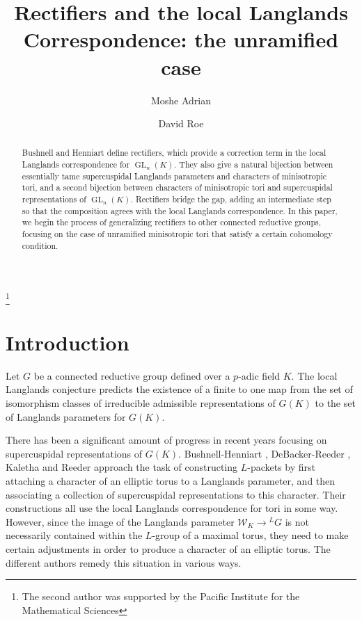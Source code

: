 \documentclass{amsart}
\theoremstyle{plain}
\theoremstyle{definition}
\numberwithin{equation}{section}
\DeclareMathOperator{\GL}{GL}
\newcommand{\Weil}{\mathcal{W}}
\begin{document}
\title[Rectifiers and the local Langlands Correspondence]{Rectifiers and the local Langlands Correspondence: the unramified case}
\author{Moshe Adrian}
\address{Department of Mathematics, University of Toronto, Toronto, ON M5S 2E4, Canada}
\author{David Roe}
\address{Department of Mathematics, University of British Columbia, Vancouver, BC V6K 1Z2, Canada}
\thanks{The second author was supported by the Pacific Institute for the Mathematical Sciences}


\begin{abstract}

Bushnell and Henniart define rectifiers, which provide a correction term
in the local Langlands correspondence for $\GL_n(K)$.  They also give a natural bijection
between essentially tame supercuspidal Langlands parameters
and characters of minisotropic tori, and a second bijection between characters
of minisotropic tori and supercuspidal representations of $\GL_n(K)$.  Rectifiers
bridge the gap, adding an intermediate step so that the composition agrees
with the local Langlands correspondence.
In this paper, we begin the process of generalizing rectifiers to other
connected reductive groups, focusing on the case of unramified minisotropic
tori that satisfy a certain cohomology condition.

\end{abstract}

\maketitle

\section{Introduction} \label{section:intro}

Let $G$ be a connected reductive group defined over a $p$-adic field $K$.
The local Langlands conjecture predicts the existence of a finite to one map
from the set of isomorphism classes of irreducible admissible representations
of $G(K)$ to the set of Langlands parameters for $G(K)$.

There has been a significant amount of progress in recent years
focusing on supercuspidal representations of $G(K)$.  Bushnell-Henniart \cite{bushnell-henniart:10a},
DeBacker-Reeder \cite{reeder-debacker:09a}, Kaletha \cite{kaletha:13a} and Reeder \cite{reeder:08a}
approach the task of constructing $L$-packets by first attaching
a character of an elliptic torus to a Langlands parameter, and
then associating a collection of supercuspidal representations to this character.
Their constructions all use the local Langlands correspondence for tori in some way.  However,
since the image of the Langlands parameter $\Weil_K \rightarrow {}^L G$ is not
necessarily contained within the $L$-group of a maximal torus, they need to make certain
adjustments in order to produce a character of an elliptic torus.  The different authors remedy this situation in various ways.
\end{document}
